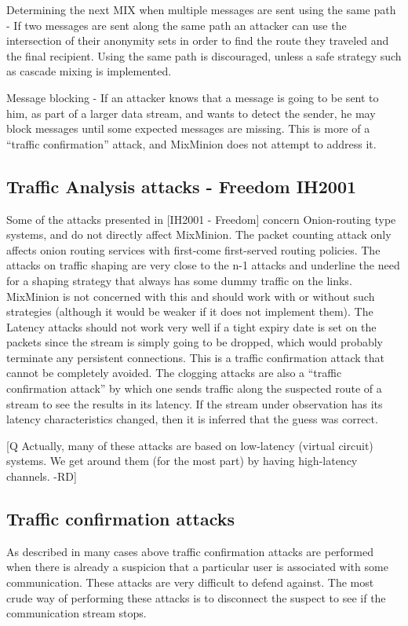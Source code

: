 \documentclass{article}
\begin{document}
Determining the next MIX when multiple messages are sent using the
same path - If two messages are sent along the same path an attacker
can use the intersection of their anonymity sets in order to find the
route they traveled and the final recipient. Using the same path is
discouraged, unless a safe strategy such as cascade mixing is
implemented. 

Message blocking - If an attacker knows that a message is going to be
sent to him, as part of a larger data stream, and wants to detect the
sender, he may block messages until some expected messages are
missing. This is more of a ``traffic confirmation'' attack, and
MixMinion does not attempt to address it.

\subsection{Traffic Analysis attacks - Freedom IH2001}

Some of the attacks presented in [IH2001 - Freedom] concern
Onion-routing type systems, and do not directly affect MixMinion. The
packet counting attack only affects onion routing services with
first-come first-served routing policies. The attacks on traffic
shaping are very close to the n-1 attacks and underline the need for a
shaping strategy that always has some dummy traffic on the
links. MixMinion is not concerned with this and should work with or
without such strategies (although it would be weaker if it does not
implement them). The Latency attacks should not work very well if a
tight expiry date is set on the packets since the stream is simply
going to be dropped, which would probably terminate any persistent
connections. This is a traffic confirmation attack that cannot be
completely avoided. The clogging attacks are also a ``traffic
confirmation attack'' by which one sends traffic along the suspected
route of a stream to see the results in its latency. If the stream
under observation has its latency characteristics changed, then it is
inferred that the guess was correct.

[Q Actually, many of these attacks are based on low-latency (virtual
circuit) systems. We get around them (for the most part) by having
high-latency channels. -RD]

\subsection{Traffic confirmation attacks}

As described in many cases above traffic confirmation attacks are
performed when there is already a suspicion that a particular user is
associated with some communication. These attacks are very difficult
to defend against. The most crude way of performing these attacks is
to disconnect the suspect to see if the communication stream stops.
\end{document}
